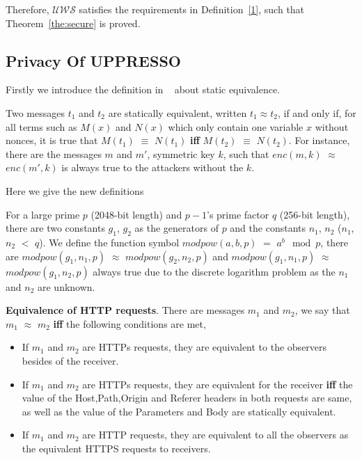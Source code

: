 Therefore,  $\mathcal{UWS}$ satisfies the requirements in Definition~\ref{1}, such that Theorem~\ref{the:secure} is proved. 

\subsection{Privacy Of UPPRESSO}
Firstly we introduce the definition in ~\cite{*} about static equivalence.
\begin{definition}
Two messages $t_1$ and $t_2$ are statically equivalent, written $t_1 \approx t_2$, if and only if, for all terms such as $M(x)$ and $N(x)$ which only contain one variable $x$ without nonces, it is true that $M(t_1)$ $\equiv$ $N(t_1)$ \textbf{iff} $M(t_2)$ $\equiv$ $N(t_2)$. For instance, there are the messages $m$ and $m'$, symmetric key $k$, such that $enc(m, k)$ $\approx$ $enc(m', k)$ is always true to the attackers without the $k$.
\label{def:staticequ}
\end{definition}

Here we give the new definitions
\begin{definition}
For a large prime $p$ (2048-bit length) and $p-1$'s prime factor $q$ (256-bit length), there are two constants $g_1$, $g_2$ as the generators of $p$ and the constants $n_1$, $n_2$ ($n_1$, $n_2$ $<$ $q$). We define the function symbol $modpow(a, b, p)$ $=$ $a^b \mod p$, there are $modpow(g_1, n_1, p)$ $\approx$ $modpow(g_2, n_2, p)$ and  $modpow(g_1, n_1, p)$ $\approx$ $modpow(g_1, n_2, p)$  always true due to the discrete logarithm problem as the $n_1$ and $n_2$ are unknown.
\label{def:powequ}
\end{definition}

\begin{definition}
\vspace{1mm}\noindent\textbf{Equivalence of HTTP requests}. There are messages $m_1$ and $m_2$, we say that $m_1$ $\approx$ $m_2$ \textbf{iff} the following conditions are met,
\begin{itemize}
\item If $m_1$ and $m_2$ are HTTPs requests, they are  equivalent to the observers besides of the receiver.
\item If  $m_1$ and $m_2$ are HTTPs requests, they are equivalent for the receiver \textbf{iff} the value of the Host,Path,Origin and Referer headers in both requests are same, as well as the value of the Parameters and Body are statically equivalent.
\item If  $m_1$ and $m_2$ are HTTP requests, they are equivalent to all the observers as the equivalent HTTPS requests to receivers.
\end{itemize}
\label{def:httpequ}
\end{definition}

